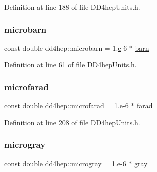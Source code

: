Definition at line 188 of file D\+D4hep\+Units.\+h.

\hypertarget{namespacedd4hep_a6547f374ef4d563258406069e1b659e0}{}\label{namespacedd4hep_a6547f374ef4d563258406069e1b659e0} 
\subsubsection{\texorpdfstring{microbarn}{microbarn}}
{\footnotesize\ttfamily const double dd4hep\+::microbarn = 1.\hyperlink{_volumes_8cpp_a8a9a1f93e9b09afccaec215310e64142}{e}-\/6 $\ast$ \hyperlink{namespacedd4hep_a561a205dfb5e2f3151e032ad640f1d35}{barn}\hspace{0.3cm}{\ttfamily [static]}}



Definition at line 61 of file D\+D4hep\+Units.\+h.

\hypertarget{namespacedd4hep_ac0a29619dce85531e693e16f0baf27d8}{}\label{namespacedd4hep_ac0a29619dce85531e693e16f0baf27d8} 
\subsubsection{\texorpdfstring{microfarad}{microfarad}}
{\footnotesize\ttfamily const double dd4hep\+::microfarad = 1.\hyperlink{_volumes_8cpp_a8a9a1f93e9b09afccaec215310e64142}{e}-\/6 $\ast$ \hyperlink{namespacedd4hep_a520a532361cb9086c6d4c69ac195ddba}{farad}\hspace{0.3cm}{\ttfamily [static]}}



Definition at line 208 of file D\+D4hep\+Units.\+h.

\hypertarget{namespacedd4hep_a3d5d57424aedb6753f4c4a9ad998b722}{}\label{namespacedd4hep_a3d5d57424aedb6753f4c4a9ad998b722} 
\subsubsection{\texorpdfstring{microgray}{microgray}}
{\footnotesize\ttfamily const double dd4hep\+::microgray = 1.\hyperlink{_volumes_8cpp_a8a9a1f93e9b09afccaec215310e64142}{e}-\/6 $\ast$ \hyperlink{namespacedd4hep_a35738d027f0d6649943f74cfc26bb7fc}{gray}\hspace{0.3cm}{\ttfamily [static]}}



